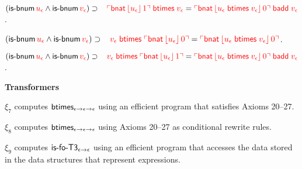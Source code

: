 \documentclass[fleqn,11pt]{article}
\begin{document}
    \item $(\mbox{\sf is-bnum} \, \textcolor{red}{u_\epsilon} \wedge \mbox{\sf is-bnum}
      \, \textcolor{red}{v_\epsilon}) \supset {}\\
        \hspace*{2ex} \textcolor{red}{\ulcorner\mbox{\sf bnat} \,
            \lfloor u_\epsilon\rfloor \, 1\urcorner \; \mbox{\sf btimes} \;
          \textcolor{red}{v_\epsilon}} = \textcolor{red}{\ulcorner\mbox{\sf bnat} \,
            \lfloor u_\epsilon \; \mbox{\sf btimes} \; v_\epsilon\rfloor \,
            0\urcorner \; \mbox{\sf badd} \; v_\epsilon}$.

    \item $(\mbox{\sf is-bnum} \, \textcolor{red}{u_\epsilon} \wedge \mbox{\sf is-bnum}
      \, \textcolor{red}{v_\epsilon}) \supset {}\\
        \hspace*{2ex} \textcolor{red}{\textcolor{red}{v_\epsilon}\; \mbox{\sf btimes} \;
          \ulcorner\mbox{\sf bnat} \, \lfloor u_\epsilon\rfloor \, 0\urcorner} =
        \textcolor{red}{\ulcorner\mbox{\sf bnat} \, \lfloor u_\epsilon \;
              \mbox{\sf btimes} \; v_\epsilon\rfloor \, 0\urcorner}$.

    \item $(\mbox{\sf is-bnum} \, \textcolor{red}{u_\epsilon} \wedge 
        \mbox{\sf is-bnum} \, \textcolor{red}{v_\epsilon}) \supset {}\\
        \hspace*{2ex} \textcolor{red}{\textcolor{red}{v_\epsilon} \; \mbox{\sf btimes} \;
          \ulcorner\mbox{\sf bnat} \, \lfloor u_\epsilon\rfloor \, 1\urcorner} =
        \textcolor{red}{\ulcorner\mbox{\sf bnat} \, \lfloor u_\epsilon \;
              \mbox{\sf btimes} \; v_\epsilon\rfloor \, 0\urcorner \; \mbox{\sf badd} \;
          v_\epsilon}$.


  \ee

  \item[] \textbf{Transformers}

  \be

      \setcounter{enumi}{6}

    \item $\xi_7$ computes $\mbox{\sf btimes}_{\epsilon \rightarrow \epsilon
      \rightarrow \epsilon}$ using an efficient program that satisfies
      Axioms 20--27.

    \item $\xi_8$ computes $\mbox{\sf btimes}_{\epsilon \rightarrow \epsilon
      \rightarrow \epsilon}$ using Axioms 20--27 as conditional rewrite
      rules.

    \item $\xi_9$ computes $\mbox{\sf is-fo-T3}_{\epsilon \rightarrow
      \epsilon}$ using an efficient program that accesses the data
      stored in the data structures that represent expressions.
\end{document}
